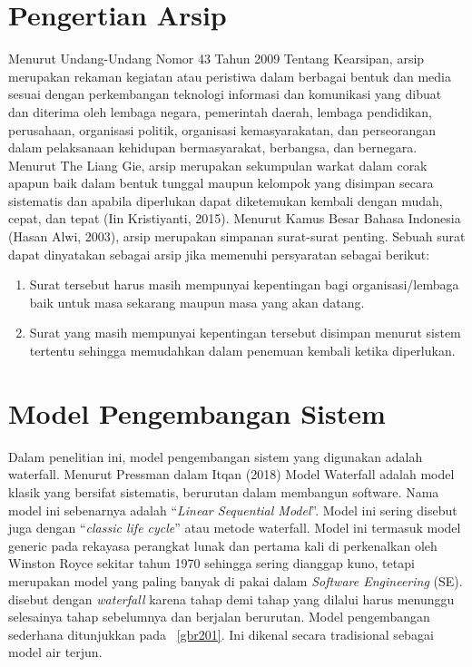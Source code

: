 \section{Pengertian Arsip}
Menurut Undang-Undang Nomor 43 Tahun 2009 Tentang Kearsipan, arsip merupakan rekaman kegiatan atau peristiwa dalam berbagai bentuk dan media sesuai dengan perkembangan teknologi informasi dan komunikasi yang dibuat dan diterima oleh lembaga negara, pemerintah daerah, lembaga pendidikan, perusahaan, organisasi politik, organisasi kemasyarakatan, dan perseorangan dalam pelaksanaan kehidupan bermasyarakat, berbangsa, dan  bernegara. Menurut The Liang Gie, arsip merupakan sekumpulan warkat dalam corak apapun baik dalam bentuk tunggal maupun kelompok yang disimpan secara sistematis dan apabila diperlukan dapat diketemukan kembali dengan mudah, cepat, dan tepat (Iin Kristiyanti, 2015). Menurut Kamus Besar Bahasa Indonesia (Hasan Alwi, 2003), arsip merupakan simpanan surat-surat penting. Sebuah surat dapat dinyatakan sebagai arsip jika memenuhi persyaratan sebagai berikut:
\begin{enumerate}
	\item Surat tersebut harus masih mempunyai kepentingan bagi organisasi/lembaga baik untuk masa sekarang maupun masa yang akan datang.
	\item Surat yang masih mempunyai kepentingan tersebut disimpan menurut sistem tertentu sehingga memudahkan dalam penemuan kembali ketika diperlukan.
	
\end{enumerate}


\section{Model Pengembangan Sistem}
Dalam penelitian ini, model pengembangan sistem yang digunakan adalah waterfall. Menurut Pressman dalam Itqan (2018) Model Waterfall adalah model klasik yang bersifat sistematis, berurutan dalam membangun software. Nama model ini sebenarnya adalah “\textit{Linear Sequential Model}”. Model ini sering disebut juga dengan “\textit{classic life cycle}” atau metode waterfall. Model ini termasuk model generic pada rekayasa perangkat lunak dan pertama kali di perkenalkan oleh Winston Royce sekitar tahun 1970 sehingga sering dianggap kuno, tetapi merupakan model yang paling banyak di pakai dalam \textit{Software Engineering} (SE). disebut dengan \textit{waterfall} karena tahap demi tahap yang dilalui harus menunggu selesainya tahap sebelumnya dan berjalan berurutan.
Model pengembangan sederhana ditunjukkan pada \pic~\ref{gbr201}. Ini dikenal secara tradisional sebagai model air terjun.

